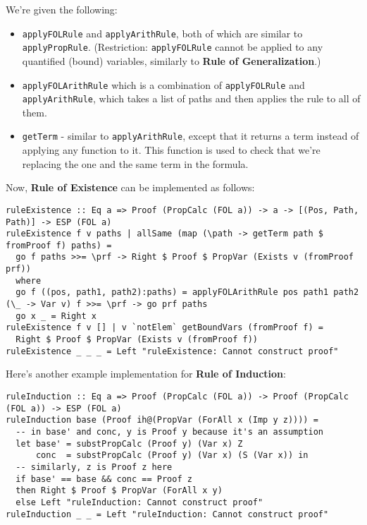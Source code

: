 \documentclass{article}
\begin{document}
We're given the following:

\begin{itemize}
\item \texttt{applyFOLRule} and \texttt{applyArithRule}, both of which are similar to \texttt{applyPropRule}. (Restriction: \texttt{applyFOLRule} cannot be applied to any quantified (bound) variables, similarly to \textbf{Rule of Generalization}.)
\item \texttt{applyFOLArithRule} which is a combination of \texttt{applyFOLRule} and \texttt{applyArithRule}, which takes a list of paths and then applies the rule to all of them.
\item \texttt{getTerm} - similar to \texttt{applyArithRule}, except that it returns a term instead of applying any function to it. This function is used to check that we're replacing the one and the same term in the formula.
\end{itemize}

Now, \textbf{Rule of Existence} can be implemented as follows:

\begin{lstlisting}
ruleExistence :: Eq a => Proof (PropCalc (FOL a)) -> a -> [(Pos, Path, Path)] -> ESP (FOL a)
ruleExistence f v paths | allSame (map (\path -> getTerm path $ fromProof f) paths) =
  go f paths >>= \prf -> Right $ Proof $ PropVar (Exists v (fromProof prf))
  where
  go f ((pos, path1, path2):paths) = applyFOLArithRule pos path1 path2 (\_ -> Var v) f >>= \prf -> go prf paths
  go x _ = Right x
ruleExistence f v [] | v `notElem` getBoundVars (fromProof f) =
  Right $ Proof $ PropVar (Exists v (fromProof f))
ruleExistence _ _ _ = Left "ruleExistence: Cannot construct proof"
\end{lstlisting}

Here's another example implementation for \textbf{Rule of Induction}:

\begin{lstlisting}
ruleInduction :: Eq a => Proof (PropCalc (FOL a)) -> Proof (PropCalc (FOL a)) -> ESP (FOL a)
ruleInduction base (Proof ih@(PropVar (ForAll x (Imp y z)))) =
  -- in base' and conc, y is Proof y because it's an assumption
  let base' = substPropCalc (Proof y) (Var x) Z
      conc  = substPropCalc (Proof y) (Var x) (S (Var x)) in
  -- similarly, z is Proof z here
  if base' == base && conc == Proof z
  then Right $ Proof $ PropVar (ForAll x y)
  else Left "ruleInduction: Cannot construct proof"
ruleInduction _ _ = Left "ruleInduction: Cannot construct proof"
\end{lstlisting}
\end{document}
